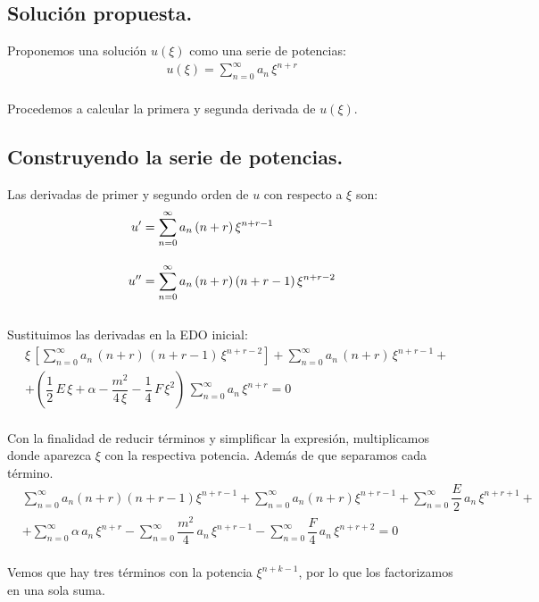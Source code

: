 \subsection{Solución propuesta.}

Proponemos una solución $u(\xi)$ como una serie de potencias:
\begin{align*}
u(\xi) = \sum_{n=0}^{\infty} a_{n} \, \xi^{n+r}
\end{align*}
\\
Procedemos a calcular la primera y segunda derivada de $u(\xi)$.

\subsection{Construyendo la serie de potencias.}

Las derivadas de primer y segundo orden de $u$ con respecto a $\xi$ son:
\begin{align*}
{u}^{\prime} &= \sum_{n=0}^{\infty} a_{n} \, (n + r) \, \xi^{n+r-1} \\[1em]
{u}^{\prime \prime} &= \sum_{n=0}^{\infty} a_{n} \, (n + r) \, (n + r - 1) \, \xi^{n+r-2}
\end{align*}
\\
Sustituimos las derivadas en la EDO inicial:
\begin{align*}
&\xi \, \left[ \sum_{n=0}^{\infty} a_{n} \, (n {+} r) \, (n {+} r {-} 1) \, \xi^{n{+}r{-}2} \right] + \sum_{n=0}^{\infty} a_{n} \, (n {+} r) \, \xi^{n{+}r{-}1} + \\[1em]
&+ \left( \dfrac{1}{2} \, E \, \xi {+} \alpha {-} \dfrac{m^{2}}{4 \, \xi} {-} \dfrac{1}{4} \, F \, \xi^{2} \right) \, \sum_{n=0}^{\infty} a_{n} \, \xi^{n{+}r} = 0
\end{align*}
\\
Con la finalidad de reducir términos y simplificar la expresión, multiplicamos donde aparezca $\xi$ con la respectiva potencia. Además de que separamos cada término.
\begin{align*}
&{} \sum_{n=0}^{\infty} a_{n} (n {+} r) (n {+} r {-} 1) \xi^{n{+}r{-}1} + \sum_{n=0}^{\infty} a_{n} (n {+} r) \xi^{n{+}r{-}1} + \sum_{n=0}^{\infty} \dfrac{E}{2} \, a_{n} \, \xi^{n{+}r{+}1} + \\[1em]
&+ \sum_{n=0}^{\infty} \alpha \, a_{n} \, \xi^{n{+}r} - \sum_{n=0}^{\infty}  \dfrac{m^{2}}{4} \, a_{n} \, \xi^{n{+}r{-}1} - \sum_{n=0}^{\infty} \dfrac{F}{4} \, a_{n} \, \xi^{n{+}r{+}2} = 0
\end{align*}
\\
Vemos que hay tres términos con la potencia $\xi^{n+k-1}$, por lo que los factorizamos en una sola suma.
